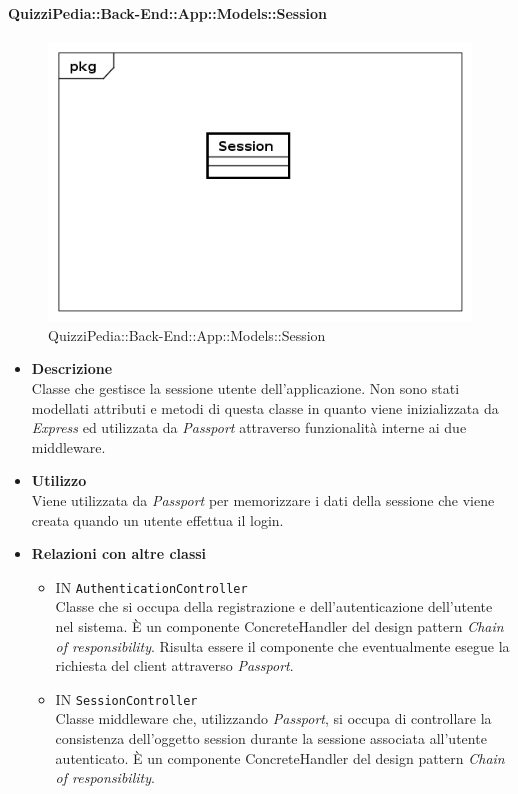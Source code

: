 \paragraph{QuizziPedia::Back-End::App::Models::Session}
\label{QuizziPedia::Back-End::App::Models::Session}
\begin{figure}[ht]
	\centering
	\includegraphics[scale=0.45]{UML/Classi/Back-End/QuizziPedia_Back-End_App_Models_sessionModel.png}
	\caption{QuizziPedia::Back-End::App::Models::Session}
\end{figure}
\FloatBarrier
	\begin{itemize}
		\item \textbf{Descrizione} \\
		Classe che gestisce la sessione utente dell'applicazione. Non sono stati modellati attributi e metodi di questa classe in quanto viene inizializzata da \textit{Express} ed utilizzata da \textit{Passport} attraverso funzionalità interne ai due middleware.
		\item \textbf{Utilizzo} \\
		Viene utilizzata da \textit{Passport} per memorizzare i dati della sessione che viene creata quando un utente effettua il login.
		\item \textbf{Relazioni con altre classi} \\
			\begin{itemize}
				\item
				IN \texttt{AuthenticationController} \\
				Classe che si occupa della registrazione e dell'autenticazione dell'utente nel sistema. È un componente ConcreteHandler del design pattern \textit{Chain of responsibility}. Risulta essere il componente che eventualmente esegue la richiesta del client attraverso \textit{Passport}.			
				\item
				IN \texttt{SessionController} \\
				Classe middleware che, utilizzando \textit{Passport}, si occupa di controllare la consistenza dell'oggetto session durante la sessione associata all'utente autenticato. È un componente ConcreteHandler del design pattern \textit{Chain of responsibility}.
			\end{itemize}
	\end{itemize}